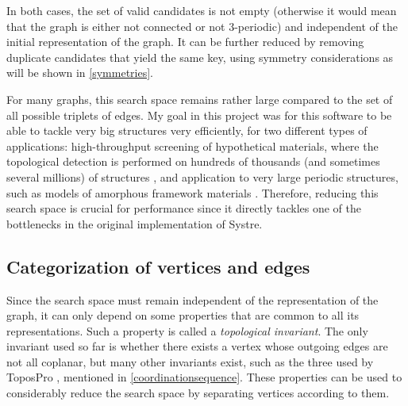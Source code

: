\documentclass[main.tex]{subfiles}
\begin{document}
In both cases, the set of valid candidates is not empty (otherwise it would mean that the graph is either not connected or not 3-periodic) and independent of the initial representation of the graph. It can be further reduced by removing duplicate candidates that yield the same key, using symmetry considerations as will be shown in \cref{symmetries}.


For many graphs, this search space remains rather large compared to the set of all possible triplets of edges.  %
My goal in this project was for this software to be able to tackle very big structures very efficiently, for two different types of applications: high-throughput screening of hypothetical materials, where the topological detection is performed on hundreds of thousands (and sometimes several millions) of structures \autocite{ren2022highthroughput}, and application to very large periodic structures, such as models of amorphous framework materials \autocite{castel2022atomistic}. Therefore, reducing this search space is crucial for performance since it directly tackles one of the bottlenecks in the original implementation of Systre.

\subsection{Categorization of vertices and edges}

Since the search space must remain independent of the representation of the graph, it can only depend on some properties that are common to all its representations. Such a property is called a \emph{topological invariant}. The only invariant used so far is whether there exists a vertex whose outgoing edges are not all coplanar, but many other invariants exist, such as the three used by ToposPro \autocite{ToposPro}, mentioned in \cref{coordinationsequence}. These properties can be used to considerably reduce the search space by separating vertices according to them.
\end{document}
